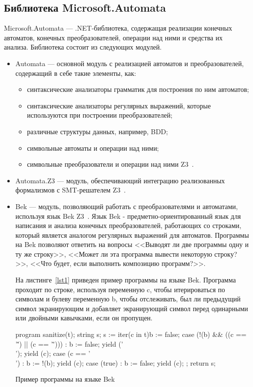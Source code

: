 \documentclass[14pt]{matmex-diploma}
\begin{document}
\subsection{Библиотека Microsoft.Automata}
Microsoft.Automata --- .NET-библиотека, содержащая реализации конечных автоматов, конечных преобразователей, операции над ними и средства их анализа. Библиотека состоит из следующих модулей.
\begin{itemize}
\item Automata --- основной модуль с реализацией автоматов и преобразователей, содержащий в себе такие элементы, как:
    \begin{itemize}
    \item синтаксические анализаторы грамматик для построения по ним автоматов;
    \item синтаксические анализаторы регулярных выражений, которые используются при построении преобразователей;
    \item различные структуры данных, например, BDD;
    \item символьные автоматы и операции над ними;
    \item символьные преобразователи и операции над ними Z3~\cite{STcompose}. 
    \end{itemize}
\item Automata.Z3 --- модуль, обеспечивающий интеграцию реализованных формализмов с SMT-решателем Z3~\cite{Z3Url, articleZ3}.
\item Bek --- модуль, позволяющий работать с преобразователями и автоматами, используя язык Bek Z3~\cite{BekUrl, BekArticle}. Язык Bek - предметно-ориентированный язык для написания и анализа конечных преобразователей, работающих со строками, который является аналогом регулярных выражений для автоматов. Программы на Bek позволяют ответить на вопросы <<Выводят ли две программы одну и ту же строку>>, <<Может ли эта программа вывести некоторую строку?>>, <<Что будет, если выполнить композицию программ?>>.

На листинге~\ref{lst1} приведен пример программы на языке Bek. Программа проходит по строке, используя переменную c, чтобы итерироваться по символам и булеву переменную b, чтобы отслеживать, был ли предыдущий символ экранирующим и добавляет экранирующий символ перед одинарными или двойными кавычками, если он пропущен. 

\begin{listing}[H]
    \begin{pyglist}[language=csharp,numbers=left,numbersep=5pt]
program sanitize(t);
    string s; 
    s := iter(c in t){b := false;}{
            case (!(b) && ((c == '\'') || (c == '\"'))) :
                b := false;
                yield ('\\');
                yield (c);
            case (c == '\\') :
                b := !(b);
                yield (c);
            case (true) :
                b := false;
                yield (c);
            };
    return s;
    \end{pyglist}
\caption{Пример программы на языке Bek}
\label{lst1}
\end{listing}
\end{itemize}
\end{document}
